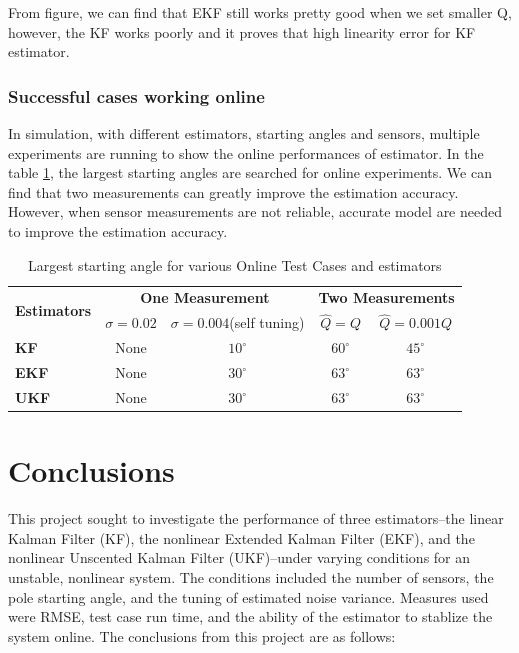 \documentclass{article}
\begin{document}
From figure, we can find that EKF still works pretty good when we set smaller Q, however, the KF works poorly and it proves that high linearity error for KF estimator.
\subsubsection{Successful cases working online}
In simulation, with different estimators, starting angles and sensors, multiple experiments are running to show the online performances of estimator. In the table \ref{table:offlinecases}, the largest starting angles are searched for online experiments. We can find that two measurements can greatly improve the estimation accuracy. However, when sensor measurements are not reliable, accurate model are needed to improve the estimation accuracy.
\begin{table}[h!]
	\centering
	\renewcommand{\arraystretch}{1.5}
	\begin{tabular}{ |l |c  |c |c | c|}
		\hline
		\multirow{2}{*}{\textbf{Estimators}} & \multicolumn{2}{|c|}{\textbf{One Measurement}} & \multicolumn{2}{|c|}{\textbf{Two Measurements}} \\ \cline{2-5}
		& $\sigma = 0.02$ & $\sigma=0.004$(self tuning) & $\hat{Q} = Q$ & $\hat{Q} = 0.001Q$ \\ \hline
		\textbf{KF} & None & $10^\circ{}$ & $60^\circ{}$ & $45^\circ{}$ \\ \hline
		\textbf{EKF} & None & $30^\circ{}$ & $63^\circ{}$ & $63^\circ{}$ \\ \hline
		\textbf{UKF} & None & $30^\circ{}$ & $63^\circ{}$ & $63^\circ{}$ \\ \hline
	\end{tabular}
	\caption{Largest starting angle for various Online Test Cases and estimators}
	\label{table:offlinecases}
\end{table}


\section{Conclusions}

This project sought to investigate the performance of three estimators--the linear Kalman Filter (KF), the nonlinear Extended Kalman Filter (EKF), and the nonlinear Unscented Kalman Filter (UKF)--under varying conditions for an unstable, nonlinear system.  The conditions included the number of sensors, the pole starting angle, and the tuning of estimated noise variance.  Measures used were RMSE, test case run time, and the ability of the estimator to stablize the system online.  The conclusions from this project are as follows:
\end{document}
